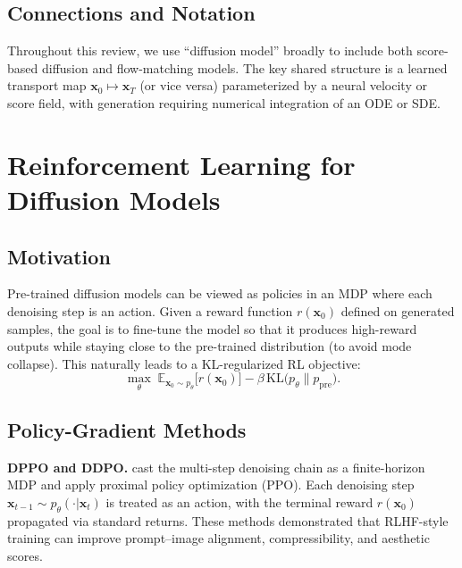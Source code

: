 \documentclass[11pt]{article}
\begin{document}
\subsection{Connections and Notation}

Throughout this review, we use ``diffusion model'' broadly to include both score-based diffusion and flow-matching models.
The key shared structure is a learned transport map $\mathbf{x}_0 \mapsto \mathbf{x}_T$ (or vice versa) parameterized by a neural velocity or score field, with generation requiring numerical integration of an ODE or SDE.

\section{Reinforcement Learning for Diffusion Models}
\label{sec:rl}

\subsection{Motivation}

Pre-trained diffusion models can be viewed as policies in an MDP where each denoising step is an action.
Given a reward function $r(\mathbf{x}_0)$ defined on generated samples, the goal is to fine-tune the model so that it produces high-reward outputs while staying close to the pre-trained distribution (to avoid mode collapse).
This naturally leads to a KL-regularized RL objective:
\begin{equation}
    \max_\theta\; \mathbb{E}_{\mathbf{x}_0 \sim p_\theta}\bigl[r(\mathbf{x}_0)\bigr] - \beta\, \mathrm{KL}\bigl(p_\theta \| p_{\mathrm{pre}}\bigr).
    \label{eq:rl_objective}
\end{equation}

\subsection{Policy-Gradient Methods}

\textbf{DPPO and DDPO.}
\citet{black2024training,fan2024reinforcement} cast the multi-step denoising chain as a finite-horizon MDP and apply proximal policy optimization (PPO).
Each denoising step $\mathbf{x}_{t-1} \sim p_\theta(\cdot | \mathbf{x}_t)$ is treated as an action, with the terminal reward $r(\mathbf{x}_0)$ propagated via standard returns.
These methods demonstrated that RLHF-style training can improve prompt--image alignment, compressibility, and aesthetic scores.
\end{document}
